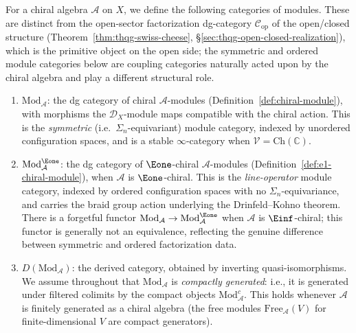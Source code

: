 \begin{definition}\label{def:module-categories}
For a chiral algebra $\mathcal{A}$ on $X$, we define the following
categories of modules. These are distinct from the open-sector
factorization dg-category $\mathcal{C}_{\mathrm{op}}$ of the
open/closed structure
(Theorem~\ref{thm:thqg-swiss-cheese}, \S\ref{sec:thqg-open-closed-realization}),
which is the primitive object on the open side; the symmetric and
ordered module categories below are coupling categories naturally
acted upon by the chiral algebra and play a different structural
role.
\begin{enumerate}[label=(\roman*)]
\item $\mathrm{Mod}_{\mathcal{A}}$: the dg category of chiral
 $\mathcal{A}$-modules (Definition~\ref{def:chiral-module}),
 with morphisms the $\mathcal{D}_X$-module maps compatible with
 the chiral action. This is the \emph{symmetric} (i.e.\ $\Sigma_n$-equivariant) module category, indexed by
 unordered configuration spaces, and is a stable $\infty$-category
 when $\mathcal{V} = \mathrm{Ch}(\mathbb{C})$.
\item $\mathrm{Mod}^{\Eone}_{\mathcal{A}}$: the dg category of
 $\Eone$-chiral $\mathcal{A}$-modules
 (Definition~\ref{def:e1-chiral-module}), when $\mathcal{A}$ is
 $\Eone$-chiral. This is the \emph{line-operator} module category,
 indexed by ordered configuration spaces with no
 $\Sigma_n$-equivariance, and carries the braid group action
 underlying the Drinfeld--Kohno theorem. There is a forgetful
 functor $\mathrm{Mod}_{\mathcal{A}} \to
 \mathrm{Mod}^{\Eone}_{\mathcal{A}}$ when $\mathcal{A}$ is
 $\Einf$-chiral; this functor is generally not an equivalence,
 reflecting the genuine difference between symmetric and ordered
 factorization data.
\item $D(\mathrm{Mod}_{\mathcal{A}})$: the derived category,
 obtained by inverting quasi-isomorphisms. We assume throughout
 that $\mathrm{Mod}_{\mathcal{A}}$ is \emph{compactly generated}:
 i.e., it is generated under filtered colimits by the compact
 objects $\mathrm{Mod}_{\mathcal{A}}^c$. This holds whenever
 $\mathcal{A}$ is finitely generated as a chiral algebra
 (the free modules
 $\mathrm{Free}_{\mathcal{A}}(V)$ for finite-dimensional $V$
 are compact generators).
\end{enumerate}
\end{definition}

